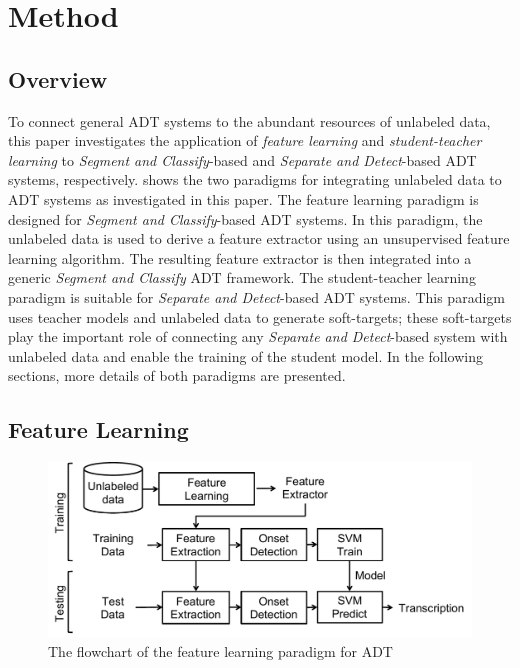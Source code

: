 \documentclass{article}
\begin{document}
%
\section{Method}
\label{sec:method}
\subsection{Overview}

To connect general ADT systems to the abundant resources of unlabeled data, this paper investigates the application of \textit{feature learning} and \textit{student-teacher learning} to \textit{Segment and Classify}-based and \textit{Separate and Detect}-based ADT systems, respectively.  shows the two paradigms for integrating unlabeled data to ADT systems as investigated in this paper. The feature learning paradigm is designed for \textit{Segment and Classify}-based ADT systems. In this paradigm, the unlabeled data is used to derive a feature extractor using an unsupervised feature learning algorithm. The resulting feature extractor is then integrated into a generic \textit{Segment and Classify} ADT framework. The student-teacher learning paradigm is suitable for \textit{Separate and Detect}-based ADT systems. This paradigm uses teacher models and unlabeled data to generate soft-targets; these soft-targets play the important role of connecting any \textit{Separate and Detect}-based system with unlabeled data and enable the training of the student model. In the following sections, more details of both paradigms are presented. 

\subsection{Feature Learning}
\label{subsec:featureLearning}


\begin{figure}
\centering
\includegraphics[width = \columnwidth]{./figs/featurelearningSys.pdf}
\caption{The flowchart of the feature learning paradigm for ADT}
\label{fig:featureLearningFlow}
\end{figure}
\end{document}
